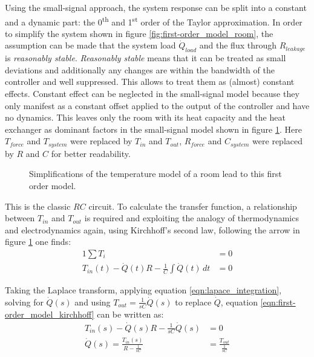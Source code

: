 Using the small-signal approach, the system response can be split into a constant and a dynamic part: the 0\textsuperscript{th} and 1\textsuperscript{st} order of the Taylor approximation. In order to simplify the system shown in figure \ref{fig:first-order_model_room}, the assumption can be made that the system load $\dot Q_{load}$ and the flux through $R_{leakage}$ is \textit{reasonably stable}. \textit{Reasonably stable} means that it can be treated as small deviations and additionally any changes are within the bandwidth of the controller and well suppressed. This allows to treat them as (almost) constant effects. Constant effect can be neglected in the small-signal model because they only manifest as a constant offset applied to the output of the controller and have no dynamics. This leaves only the room with its heat capacity and the heat exchanger as dominant factors in the small-signal model shown in figure \ref{fig:first-order_model}. Here $T_{force}$ and $T_{system}$ were replaced by $T_{in}$ and $T_{out}$, $R_{force}$ and $C_{system}$ were replaced by $R$ and $C$ for better readability.
\begin{figure}[htb]
    \centering
    \caption{Simplifications of the temperature model of a room lead to this first order model.}
    \label{fig:first-order_model}
\end{figure}

This is the classic $RC$ circuit. To calculate the transfer function, a relationship between $T_{in}$ and $T_{out}$ is required and exploiting the analogy of thermodynamics and electrodynamics again, using Kirchhoff's second law, following the arrow in figure \ref{fig:first-order_model} one finds:
\begin{alignat}{1}
    \sum T_i &= 0 \nonumber\\
    T_{in}(t) - \dot{Q}(t) R - \frac 1 C \int \dot{Q}(t)\,dt &= 0 \label{eqn:first-order_model_kirchhoff}
\end{alignat}

Taking the Laplace transform, applying equation \ref{eqn:lapace_integration}, solving for $ \dot Q(s)$ and using $T_{out} = \frac{1}{sC} \dot Q(s)$ to replace $\dot Q$, equation \ref{eqn:first-order_model_kirchhoff} can be written as:
\begin{align*}
    T_{in}(s) - \dot{Q}(s) R - \frac{1}{sC} \dot{Q}(s) &= 0\\
    \dot{Q}(s) = \frac{T_{in}(s)}{R-\frac{1}{sC}} &= \frac{T_{out}}{\frac{1}{sC}}
\end{align*}

